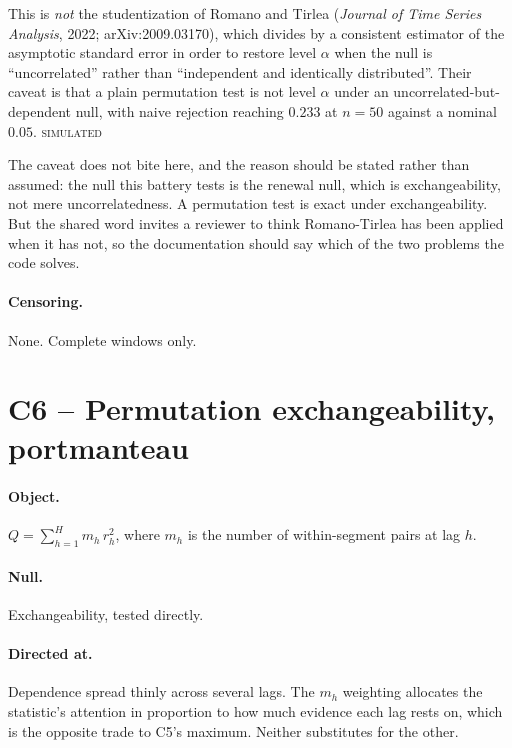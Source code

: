 \documentclass[11pt,a4paper]{article}
\newcommand{\SIMULATED}{\textsc{\textcolor{orange!70!black}{simulated}}}
\begin{document}
This is \emph{not} the studentization of Romano and Tirlea (\emph{Journal of Time Series
Analysis}, 2022; arXiv:2009.03170), which divides by a consistent estimator of the
asymptotic standard error in order to restore level $\alpha$ when the null is
\enquote{uncorrelated} rather than \enquote{independent and identically distributed}.
Their caveat is that a plain permutation test is not level $\alpha$ under an
uncorrelated-but-dependent null, with naive rejection reaching $0.233$ at $n = 50$
against a nominal $0.05$. \SIMULATED

\medskip
\noindent
The caveat does not bite here, and the reason should be stated rather than assumed: the
null this battery tests is the renewal null, which is exchangeability, not mere
uncorrelatedness. A permutation test is exact under exchangeability. But the shared word
invites a reviewer to think Romano-Tirlea has been applied when it has not, so the
documentation should say which of the two problems the code solves.

\paragraph{Censoring.} None. Complete windows only.

\section{C6 -- Permutation exchangeability, portmanteau}

\paragraph{Object.} $Q = \sum_{h=1}^{H} m_h\, r_h^2$, where $m_h$ is the number of
within-segment pairs at lag $h$.

\paragraph{Null.} Exchangeability, tested directly.

\paragraph{Directed at.} Dependence spread thinly across several lags. The $m_h$
weighting allocates the statistic's attention in proportion to how much evidence each
lag rests on, which is the opposite trade to C5's maximum. Neither substitutes for the
other.
\end{document}
